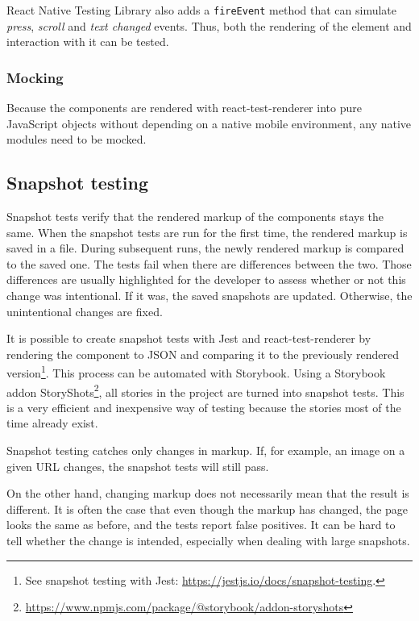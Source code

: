 \documentclass[
  printed, %
  table,   %
  oneside, %
  lof,     %
  lot,     %
]{fithesis3}
\begin{document}
React Native Testing Library also adds a \texttt{fireEvent} method that can simulate \textit{press}, \textit{scroll} and \textit{text changed} events. Thus, both the rendering of the element and interaction with it can be tested.

\subsubsection{Mocking}
Because the components are rendered with react-test-renderer into pure JavaScript objects without depending on a native mobile environment, any native modules need to be mocked.

\subsection{Snapshot testing}
\label{sec:snapshot_testing}
Snapshot tests verify that the rendered markup of the components stays the same. When the snapshot tests are run for the first time, the rendered markup is saved in a file.
During subsequent runs, the newly rendered markup is compared to the saved one. The tests fail when there are differences between the two. Those differences are usually highlighted for the developer to assess whether or not this change was intentional. If it was, the saved snapshots are updated. Otherwise, the unintentional changes are fixed.

It is possible to create snapshot tests with Jest and react-test-renderer by rendering the component to JSON and comparing it to the previously rendered version\footnote{See snapshot testing with Jest: \url{https://jestjs.io/docs/snapshot-testing}.}. This process can be automated with Storybook. Using a Storybook addon StoryShots\footnote{\url{https://www.npmjs.com/package/@storybook/addon-storyshots}}, all stories in the project are turned into snapshot tests. This is a very efficient and inexpensive way of testing because the stories most of the time already exist.

Snapshot testing catches only changes in markup. If, for example, an image on a given URL changes, the snapshot tests will still pass. 

On the other hand, changing markup does not necessarily mean that the result is different. It is often the case that even though the markup has changed, the page looks the same as before, and the tests report false positives. It can be hard to tell whether the change is intended, especially when dealing with large snapshots.
\end{document}
